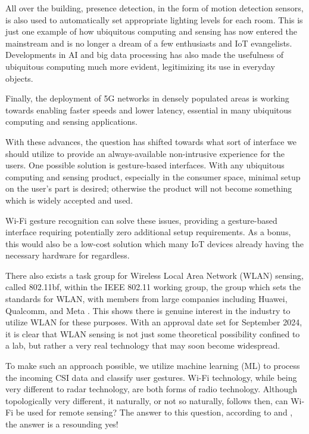 All over the building, presence detection, in the form of motion detection sensors, is also used to automatically set appropriate lighting levels for each room.
This is just one example of how ubiquitous computing and sensing has now entered the mainstream and is no longer a dream of a few enthusiasts and IoT evangelists.
Developments in AI and big data processing has also made the usefulness of ubiquitous computing much more evident, legitimizing its use in everyday objects.

Finally, the deployment of 5G networks in densely populated areas is working towards enabling faster speeds and lower latency, essential in many ubiquitous computing and sensing applications.

With these advances, the question has shifted towards what sort of interface we should utilize to provide an always-available non-intrusive experience for the users.
One possible solution is gesture-based interfaces.
With any ubiquitous computing and sensing product, especially in the consumer space, minimal setup on the user's part is desired; otherwise the product will not become something which is widely accepted and used.

Wi-Fi gesture recognition can solve these issues, providing a gesture-based interface requiring potentially zero additional setup requirements.
As a bonus, this would also be a low-cost solution which many IoT devices already having the necessary hardware for regardless.

There also exists a task group for Wireless Local Area Network (WLAN) sensing, called 802.11bf, within the IEEE 802.11 working group, the group which sets the standards for WLAN, with members from large companies including Huawei, Qualcomm, and Meta \cite{du2022overview}.
This shows there is genuine interest in the industry to utilize WLAN for these purposes.
With an approval date set for September 2024, it is clear that WLAN sensing is not just some theoretical possibility confined to a lab, but rather a very real technology that may soon become widespread.

To make such an approach possible, we utilize machine learning (ML) to process the incoming CSI data and classify user gestures.
Wi-Fi technology, while being very different to radar technology, are both forms of radio technology.
Although topologically very different, it naturally, or not so naturally, follows then, can Wi-Fi be used for remote sensing?
The answer to this question, according to \cite{adib2013see} and \cite{chetty2011through}, the answer is a resounding yes!

